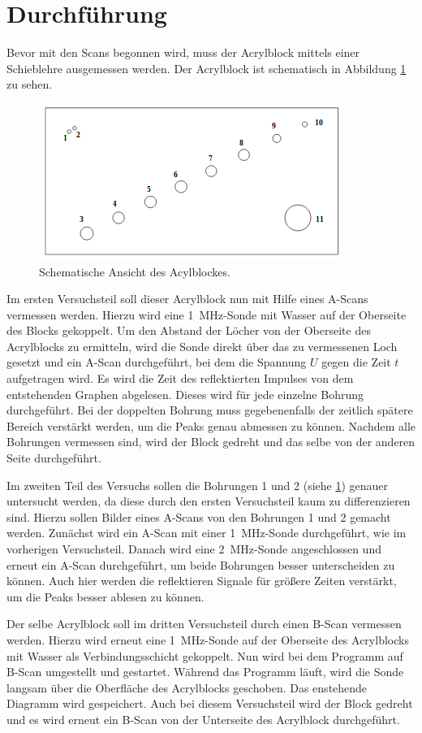 \section{Durchführung}
Bevor mit den Scans begonnen wird, muss der Acrylblock mittels einer Schieblehre ausgemessen werden. Der Acrylblock ist schematisch in Abbildung
\ref{abb3} zu sehen.
\begin{figure}
  \centering
  \includegraphics[scale=0.5]{Acrylbox.png}
  \caption{Schematische Ansicht des Acylblockes. \cite{Q1}}
  \label{abb3}
\end{figure}
Im ersten Versuchsteil soll dieser Acrylblock nun mit Hilfe eines A-Scans vermessen werden. Hierzu wird eine \SI{1}{\mega\hertz}-Sonde mit Wasser
auf der Oberseite des Blocks gekoppelt. Um den Abstand der Löcher von der Oberseite des Acrylblocks zu ermitteln, wird die Sonde direkt über das zu
vermessenen Loch gesetzt und ein A-Scan durchgeführt, bei dem die Spannung $U$ gegen die Zeit $t$ aufgetragen wird.
Es wird die Zeit des reflektierten Impulses von dem entstehenden Graphen abgelesen.
Dieses wird für jede einzelne Bohrung durchgeführt. Bei der doppelten Bohrung muss gegebenenfalls der zeitlich spätere Bereich verstärkt werden, um
die Peaks genau abmessen zu können.
Nachdem alle Bohrungen vermessen sind, wird der Block gedreht und das selbe von der anderen Seite durchgeführt.

Im zweiten Teil des Versuchs sollen die Bohrungen 1 und 2 (siehe \ref{abb3}) genauer untersucht werden, da diese durch den ersten Versuchsteil kaum
zu differenzieren sind. Hierzu sollen Bilder eines A-Scans von den Bohrungen 1 und 2 gemacht werden. Zunächst wird ein A-Scan mit einer
\SI{1}{\mega\hertz}-Sonde durchgeführt, wie im vorherigen Versuchsteil. Danach wird eine \SI{2}{\mega\hertz}-Sonde angeschlossen und erneut ein
A-Scan durchgeführt, um beide Bohrungen besser unterscheiden zu können. Auch hier werden die reflektieren Signale für größere Zeiten verstärkt,
um die Peaks besser ablesen zu können.

Der selbe Acrylblock soll im dritten Versuchsteil durch einen B-Scan vermessen werden. Hierzu wird erneut eine \SI{1}{\mega\hertz}-Sonde auf der
Oberseite des Acrylblocks mit Wasser als Verbindungsschicht gekoppelt. Nun wird bei dem Programm auf B-Scan umgestellt und gestartet. Während das
Programm läuft, wird die Sonde langsam über die Oberfläche des Acrylblocks geschoben. Das enstehende Diagramm wird gespeichert.
Auch bei diesem Versuchsteil wird der Block gedreht und es wird erneut ein B-Scan von der Unterseite des Acrylblock durchgeführt.

